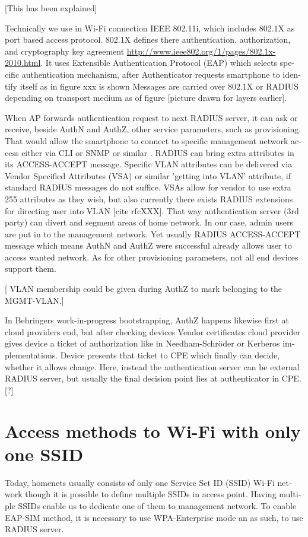 \documentclass[12pt,a4paper,english]{tutthesis}
\begin{document}
\begin{otherlanguage}{english}
[This has been explained]

Technically we use in Wi-Fi connection IEEE 802.11i, which includes
802.1X as port based access protocol.  802.1X defines there
authentication, authorization, and cryptography key agreement
\url{http://www.ieee802.org/1/pages/802.1x-2010.html}. It uses
Extensible Authentication Protocol (EAP) which selects specific
authentication mechanism\cite[p.3]{rfc5247}, after Authenticator
requests smartphone to identify itself as in figure xxx is shown
Messages are carried over 802.1X or RADIUS depending on transport
medium as of figure [picture drawn for layers earlier].


When AP forwards authentication request to next RADIUS server, it can
ask or receive, beside AuthN and AuthZ, other service parameters, such
as provisioning. That would allow the smartphone to connect to
specific management network access either via CLI or SNMP or similar
\cite[p.4]{rfc5608}.  RADIUS can bring extra attributes in its
ACCESS-ACCEPT message.  Specific VLAN attributes can be delivered via
Vendor Specified Attributes (VSA) or similar 'getting into VLAN'
attribute, if standard RADIUS messages do not suffice.  VSAs allow for
vendor to use extra 255 attributes as they wish, but also currently
there exists RADIUS extensions for directing user into VLAN [cite
rfcXXX].  That way authentication server (3rd party) can divert and
segment areas of home network.  In our case, admin users are put in to
the management network.
  Yet usually RADIUS ACCESS-ACCEPT message which means AuthN and
AuthZ were successful already allows user to access wanted network. As
for other provisioning parameters, not all end devices support them.

[ VLAN membership could be given during AuthZ to mark belonging to the
MGMT-VLAN.]  





In Behringers work-in-progress  bootstrapping\cite{draft-behringer-bootstrap},
AuthZ happens likewise first at cloud providers
end, but after checking devices Vendor certificates cloud provider
gives device a ticket of authorization like in Needham-Schröder or
Kerberos implementations. Device presents that ticket to CPE which
finally can decide, whether it allows change. 
Here, instead the authentication server can be external RADIUS server,
but usually the final decision point lies at authenticator in CPE.
[?]


\section{Access methods to Wi-Fi with only one SSID}
\label{sec-4-4}
Today, homenets usually consists of only one Service Set ID (SSID)
Wi-Fi network though it is possible to define multiple SSIDs in
access point. Having multiple SSIDs enable us to dedicate one of them
to management network. 
To enable EAP-SIM method, it is necessary to use WPA-Enterprise mode
an as such, to use RADIUS server.


\end{otherlanguage}
\end{document}
